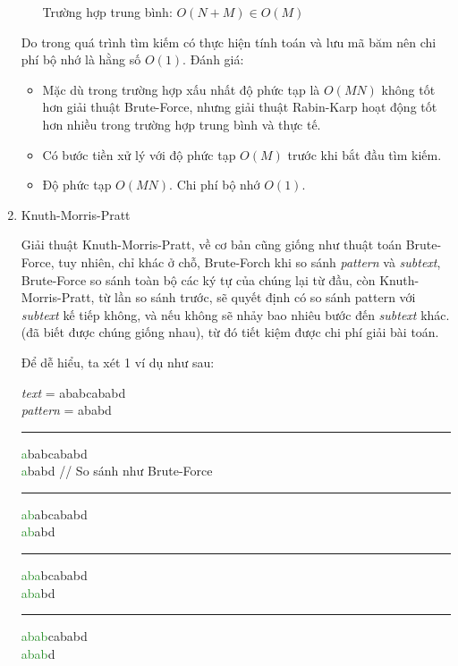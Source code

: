 \documentclass[a4paper,11pt]{article}
\begin{document}
\begin{enumerate}
\begin{itemize}
				Trường hợp trung bình: $O(N+M) \in O(M)$
			\end{itemize}
				Do trong quá trình tìm kiếm có thực hiện tính toán và lưu mã băm nên chi phí bộ nhớ là hằng số $O(1)$.
			Đánh giá:
			\begin{itemize}
				\item Mặc dù trong trường hợp xấu nhất độ phức tạp là $O(MN)$ không tốt hơn giải thuật Brute-Force, nhưng giải thuật Rabin-Karp hoạt động tốt hơn nhiều trong trường hợp trung bình và thực tế.
				\item Có bước tiền xử lý với độ phức tạp $O(M)$ trước khi bắt đầu tìm kiếm.
				\item Độ phức tạp $O(MN)$. Chi phí bộ nhớ $O(1)$.
			\end{itemize}
		\item Knuth-Morris-Pratt
		
			Giải thuật Knuth-Morris-Pratt, về cơ bản cũng giống như thuật toán Brute-Force, 
			tuy nhiên, chỉ khác ở chỗ, Brute-Forch khi so sánh \textit{pattern} và \textit{subtext}, Brute-Force so sánh toàn bộ 
			các ký tự của chúng lại từ đầu, còn Knuth-Morris-Pratt, từ lần so sánh trước, sẽ quyết định có so sánh pattern với \textit{subtext} kế tiếp không, 
			và nếu không sẽ nhảy bao nhiêu bước đến \textit{subtext} khác. 
			(đã biết được chúng giống nhau), từ đó tiết kiệm được chi phí giải bài toán.

			Để dễ hiểu, ta xét 1 ví dụ như sau: 
			
			\textit{text} \hspace*{6mm}= ababcababd\\
			\textit{pattern} \hspace*{0.1mm}= ababd
			
			\vspace*{4mm}
			\hrule
			\textcolor{ForestGreen}{a}babcababd\\
			\textcolor{ForestGreen}{a}babd \hspace*{1.8cm} // So sánh như Brute-Force

			\vspace*{2mm}
			\hrule
			\textcolor{ForestGreen}{ab}abcababd\\
			\textcolor{ForestGreen}{ab}abd
			
			\vspace*{2mm}
			\hrule
			\textcolor{ForestGreen}{aba}bcababd\\
			\textcolor{ForestGreen}{aba}bd

			\vspace*{2mm}
			\hrule
			\textcolor{ForestGreen}{abab}cababd\\
			\textcolor{ForestGreen}{abab}d


\end{enumerate}
\end{document}
